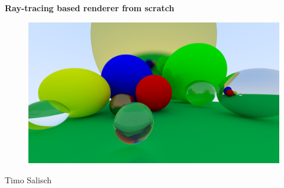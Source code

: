 \documentclass[12pt]{report}
\begin{document}
\vspace*{2cm}
\begin{center}
\textbf{\Huge Ray-tracing based renderer from scratch}
\end{center}
\vspace*{1cm}
\begin{figure}[h!]
\includegraphics[width=\textwidth]{title}
\end{figure}
\begin{center}
{\Large Timo Salisch}
\end{center}
\clearpage

\tableofcontents

\newpage
\end{document}
